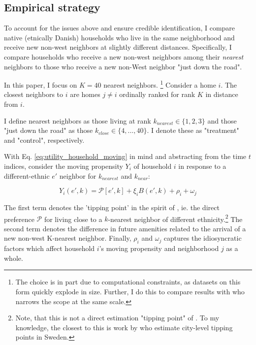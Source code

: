 \documentclass[../main.tex]{subfiles}
\begin{document}
\subsection{Empirical strategy}
To account for the issues above and ensure credible identification, I compare native (etnically Danish) households who live in the same neighborhood and receive new non-west neighbors at slightly different distances. Specifically, I compare households who receive a new non-west neighbors among their \textit{nearest} neighbors to those who receive a new non-West neighbor "just down the road". 

In this paper, I focus on $K=40$ nearest neighbors.
\footnote{The choice is in part due to computational constraints, as datasets on this form quickly explode in size. Further, I do this to compare results with \textcite{Bayer_2022_nearest_neighbor} who narrows the scope at the same scale.} Consider a home $i$. The closest neighbors to $i$ are homes $j\neq i$ ordinally ranked for rank $K$ in distance from $i$.

I define nearest neighbors as those living at rank $k_{nearest}\in \{1, 2, 3\}$ and those "just down the road" as those $k_{close} \in \{4, ..., 40\}$. I denote these as "treatment" and "control", respectively.

With Eq. \ref{eq:utility_household_moving} in mind and abstracting from the time $t$ indices, consider the moving propensity $Y_i$ of household $i$ in response to a different-ethnic $e'$ neighbor for $k_{nearest}$ and $k_{near}$:

\begin{equation}
    Y_i(e', k) = \mathcal{P}[e', k] + \xi_i B(e', k) + \rho_i + \omega_j
\end{equation}

The first term denotes the 'tipping point' in the spirit of \textcite{schelling1971dynamic}, ie. the direct preference $\mathcal{P}$ for living close to a $k$-nearest neighbor of different ethnicity.\footnote{Note, that this is not a direct estimation "tipping point" of \textcite{schelling1971dynamic}. To my knowledge, the closest to this is work by \textcite{bohlmark_willen_2020_tipping} who estimate city-level tipping points in Sweden.}   The second term denotes the difference in future amenities related  to the arrival of a new non-west K-nearest neighbor. Finally, $\rho_i$ and $\omega_j$ captures the idiosyncratic factors which affect household $i$'s moving propensity and neighborhood $j$ as a whole. 
\end{document}
